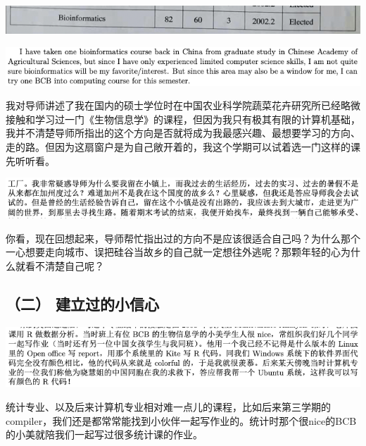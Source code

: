 \documentclass[9pt, b5paper]{article}
\begin{document}
\begin{center}
\includegraphics[width=.9\linewidth]{./pic/backups_plans_20210419_094910.png}
\end{center}

\begin{center}
\includegraphics[width=.9\linewidth]{./pic/backups_plans_20210419_085406.png}
\end{center}

我对导师讲述了我在国内的硕士学位时在中国农业科学院蔬菜花卉研究所已经略微接触和学习过一门《生物信息学》的课程，但因为我只有极其有限的计算机基础，我并不清楚导师所指出的这个方向是否就将成为我最感兴趣、最想要学习的方向、走的路。但因为这扇窗户是为自己敞开着的，我这个学期可以试着选一门这样的课先听听看。

\begin{center}
\includegraphics[width=.9\linewidth]{./pic/backups_plans_20210425_095828.png}
\end{center}

你看，现在回想起来，导师帮忙指出过的方向不是应该很适合自己吗？为什么那个一心想要走向城市、误把硅谷当故乡的自己就一定想往外逃呢？那颗年轻的心为什么就看不清楚自己呢？

\subsection{（二） 建立过的小信心}
\label{sec:orgb7a3665}

\begin{center}
\includegraphics[width=.9\linewidth]{./pic/backups_plans_20210422_090457.png}
\end{center}

统计专业、以及后来计算机专业相对难一点儿的课程，比如后来第三学期的compiler，我们还是都常常能找到小伙伴一起写作业的。统计时那个很nice的BCB的小美就陪我们一起写过很多统计课的作业。
\end{document}
